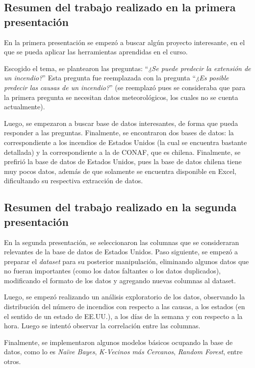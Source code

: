 \subsection{Resumen del trabajo realizado en la primera presentación}
En la primera presentación se empezó a buscar algún proyecto interesante, en el que se pueda aplicar las herramientas aprendidas en el curso. 

Escogido el tema, se plantearon las preguntas: ``\textit{¿Se puede predecir la extensión de un incendio?}'' Esta pregunta fue reemplazada con la pregunta ``\textit{¿Es posible predecir las causas de un incendio?}'' (se reemplazó pues se consideraba que para la primera pregunta se necesitan datos meteorológicos, los cuales no se cuenta actualmente).

Luego, se empezaron a buscar base de datos interesantes, de forma que pueda responder a las preguntas. Finalmente, se encontraron dos bases de datos: la correspondiente a los incendios de Estados Unidos (la cual se encuentra bastante detallada) y la correspondiente a la de CONAF, que es chilena. Finalmente, se prefirió la base de datos de Estados Unidos, pues la base de datos chilena tiene muy pocos datos, además de que solamente se encuentra disponible en Excel, dificultando su respectiva extracción de datos.

\subsection{Resumen del trabajo realizado en la segunda presentación}
En la segunda presentación, se seleccionaron las columnas que se consideraran relevantes de la base de datos de Estados Unidos. Paso siguiente, se empezó a preparar el \textit{dataset} para su posterior manipulación, eliminando algunos datos que no fueran importantes (como los datos faltantes o los datos duplicados), modificando el formato de los datos y agregando nuevas columnas al dataset.

Luego, se empezó realizando un análisis exploratorio de los datos, observando la distribución del número de incendios con respecto a las causas, a los estados (en el sentido de un estado de EE.UU.), a los días de la semana y con respecto a la hora. Luego se intentó observar la correlación entre las columnas.

Finalmente, se implementaron algunos modelos básicos ocupando la base de datos, como lo es \textit{Naïve Bayes}, \textit{K-Vecinos más Cercanos}, \textit{Random Forest}, entre otros.